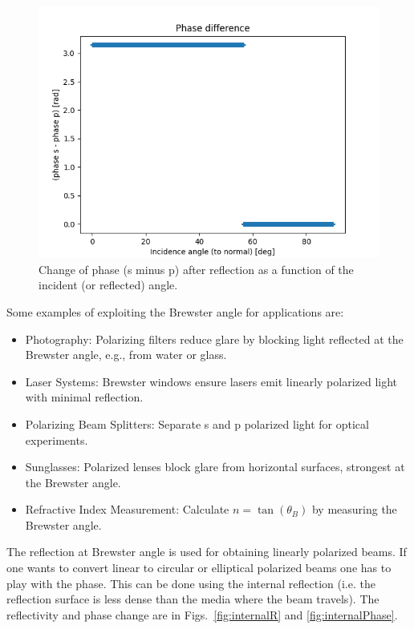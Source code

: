 \documentclass{iucr}
\begin{document}
\begin{figure}\label{fig:visiblePhase}
\centering
\includegraphics[width=0.95\linewidth]{figures/visiblePhase.png}
\caption{Change of phase (s minus p) after reflection as a function of the incident (or reflected) angle.}
\end{figure}

Some examples of exploiting the Brewster angle for applications are:
\begin{itemize}
    \item Photography: Polarizing filters reduce glare by blocking light reflected at the Brewster angle, e.g., from water or glass.
    \item Laser Systems: Brewster windows ensure lasers emit linearly polarized light with minimal reflection.
    \item Polarizing Beam Splitters: Separate s and p polarized light for optical experiments.
    \item Sunglasses: Polarized lenses block glare from horizontal surfaces, strongest at the Brewster angle.
    \item Refractive Index Measurement: Calculate $n=\tan⁡(\theta_B)$ by measuring the Brewster angle.   
\end{itemize}

The reflection at Brewster angle is used for obtaining linearly polarized beams. If one wants to convert linear to circular or elliptical polarized beams one has to play with the phase. This can be done using the internal reflection (i.e. the reflection surface is less dense than the media where the beam travels). The reflectivity and phase change are in Figs.~\ref{fig:internalR} and  \ref{fig:internalPhase}.
\end{document}
